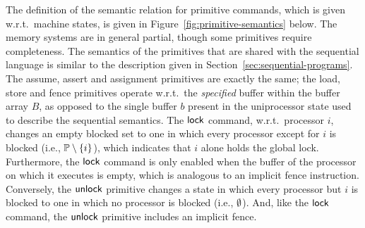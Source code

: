 \documentclass[11pt]{report}         %
\begin{document}
The definition of the semantic relation for primitive commands, which is given w.r.t.\ machine states, is given in Figure~\ref{fig:primitive-semantics} below. The memory systems are in general partial, though some primitives require completeness. The semantics of the primitives that are shared with the sequential language is  similar to the description given in Section~\ref{sec:sequential-programs}. The assume, assert and assignment primitives are exactly the same; the load, store and fence primitives operate w.r.t.\ the \emph{specified} buffer within the buffer array $B$, as opposed to the single buffer $b$ present in the uniprocessor state used to describe the sequential semantics. The $\operatorname{\mathsf{lock}}$ command, w.r.t.\ processor $i$, changes an empty blocked set to one in which every processor except for $i$ is blocked (i.e., $\mathbb{P} \setminus \left\lbrace i \right\rbrace$), which indicates that $i$ alone holds the global lock. Furthermore, the $\operatorname{\mathsf{lock}}$ command is only enabled when the buffer of the processor on which it executes is empty, which is analogous to an implicit fence instruction. Conversely, the $\operatorname{\mathsf{unlock}}$ primitive changes a state in which every processor but $i$ is blocked to one in which no processor is blocked (i.e., $\operatorname{\emptyset}$). And, like the $\operatorname{\mathsf{lock}}$ command, the $\operatorname{\mathsf{unlock}}$ primitive includes an implicit fence. 
\end{document}
